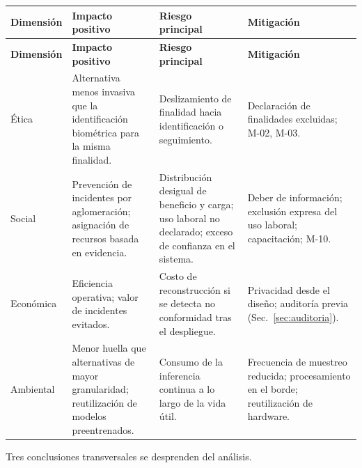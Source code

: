 {\footnotesize
\begin{longtable}{@{}L{1.9cm}L{4.0cm}L{4.0cm}L{2.6cm}@{}}
\toprule
\textbf{Dimensión} & \textbf{Impacto positivo} & \textbf{Riesgo principal} & \textbf{Mitigación} \\
\midrule
\endfirsthead
\toprule
\textbf{Dimensión} & \textbf{Impacto positivo} & \textbf{Riesgo principal} & \textbf{Mitigación} \\
\midrule
\endhead
\bottomrule
\endfoot
Ética &
Alternativa menos invasiva que la identificación biométrica para la misma
finalidad. &
Deslizamiento de finalidad hacia identificación o seguimiento. &
Declaración de finalidades excluidas; M-02, M-03. \\
\addlinespace
Social &
Prevención de incidentes por aglomeración; asignación de recursos basada
en evidencia. &
Distribución desigual de beneficio y carga; uso laboral no declarado;
exceso de confianza en el sistema. &
Deber de información; exclusión expresa del uso laboral; capacitación;
M-10. \\
\addlinespace
Económica &
Eficiencia operativa; valor de incidentes evitados. &
Costo de reconstrucción si se detecta no conformidad tras el
despliegue. &
Privacidad desde el diseño; auditoría previa
(Sec.~\ref{sec:auditoria}). \\
\addlinespace
Ambiental &
Menor huella que alternativas de mayor granularidad; reutilización de
modelos preentrenados. &
Consumo de la inferencia continua a lo largo de la vida útil. &
Frecuencia de muestreo reducida; procesamiento en el borde;
reutilización de hardware. \\
\end{longtable}}

Tres conclusiones transversales se desprenden del análisis.


